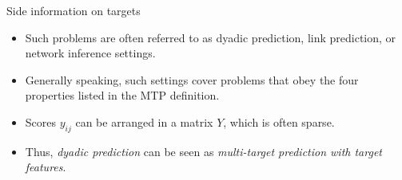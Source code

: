 \documentclass[11pt,compress,t,notes=noshow, xcolor=table]{beamer}
\begin{document}
\begin{vbframe}{Side information on targets}
\begin{itemize}
\begin{itemize}
\begin{minipage}{0.4\textwidth}
\begin{center}
				\\ Waegeman et al. (2019), Multi-target prediction:
				A unifying view on problems and methods (\href{https://arxiv.org/pdf/1809.02352.pdf}{\underline{URL}}).
			\end{center}
		\end{minipage}
		\end{itemize}
		\footnotesize
		\item Such problems are often referred to as dyadic prediction, link prediction, or network inference settings.
		\item Generally speaking, such settings cover problems that obey the four properties listed in the MTP definition. 
		\item Scores $y_{ij}$ can be arranged in a matrix $Y$, which is often sparse. 
		\item Thus, \emph{dyadic prediction} can be seen as \emph{multi-target prediction with target features}. 
	\end{itemize}
\end{vbframe}
\end{document}
